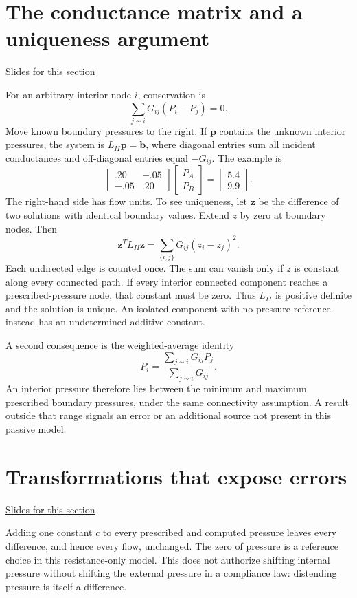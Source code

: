 \documentclass[11pt,letterpaper]{article}
\theoremstyle{definition}\newtheorem{definition}{Definition}\newtheorem{example}{Example}
\numberwithin{equation}{section}
\begin{document}
\section{The conductance matrix and a uniqueness argument}
\hypertarget{note-the-conductance-matrix-and-a-uniqueness-argument}{}\label{note:the-conductance-matrix-and-a-uniqueness-argument}
{\small \href{slides.html\#frame=the-graph-matrix\&step=1}{Slides for this section}}\par
For an arbitrary interior node $i$, conservation is
\[
\sum_{j\sim i}G_{ij}(P_i-P_j)=0.
\]
Move known boundary pressures to the right. If $\mathbf p$ contains the unknown interior pressures, the system is $L_{II}\mathbf p=\mathbf b$, where diagonal entries sum all incident conductances and off-diagonal entries equal $-G_{ij}$. The example is
\[
\begin{bmatrix}.20&-.05\\-.05&.20\end{bmatrix}
\begin{bmatrix}P_A\\P_B\end{bmatrix}
=\begin{bmatrix}5.4\\9.9\end{bmatrix}.
\]
The right-hand side has flow units. To see uniqueness, let $\mathbf z$ be the difference of two solutions with identical boundary values. Extend $z$ by zero at boundary nodes. Then
\[
\mathbf z^TL_{II}\mathbf z=\sum_{\{i,j\}}G_{ij}(z_i-z_j)^2.
\]
Each undirected edge is counted once. The sum can vanish only if $z$ is constant along every connected path. If every interior connected component reaches a prescribed-pressure node, that constant must be zero. Thus $L_{II}$ is positive definite and the solution is unique. An isolated component with no pressure reference instead has an undetermined additive constant.

A second consequence is the weighted-average identity
\[
P_i=\frac{\sum_{j\sim i}G_{ij}P_j}{\sum_{j\sim i}G_{ij}}.
\]
An interior pressure therefore lies between the minimum and maximum prescribed boundary pressures, under the same connectivity assumption. A result outside that range signals an error or an additional source not present in this passive model.
\section{Transformations that expose errors}
\hypertarget{note-transformations-that-expose-errors}{}\label{note:transformations-that-expose-errors}
{\small \href{slides.html\#frame=change-the-pressure-reference\&step=1}{Slides for this section}}\par
Adding one constant $c$ to every prescribed and computed pressure leaves every difference, and hence every flow, unchanged. The zero of pressure is a reference choice in this resistance-only model. This does not authorize shifting internal pressure without shifting the external pressure in a compliance law: distending pressure is itself a difference.
\end{document}
